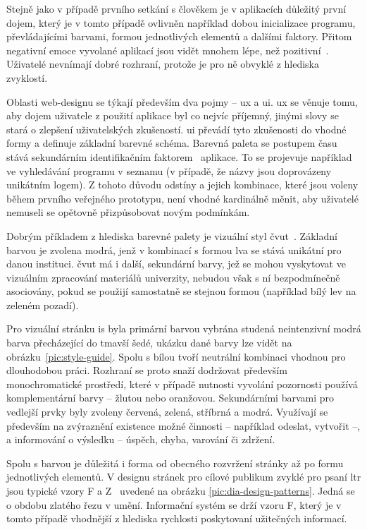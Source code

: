 Stejně jako v případě prvního setkání s člověkem je v aplikacích důležitý první dojem, který je v tomto případě ovlivněn například dobou inicializace programu, převládajícími barvami, formou jednotlivých elementů a dalšími faktory. Přitom negativní emoce vyvolané aplikací jsou vidět mnohem lépe, než pozitivní~\cite{tragicDesign}. Uživatelé nevnímají dobré rozhraní, protože je pro ně obvyklé z hlediska zvyklostí.

Oblasti web-designu se týkají především dva pojmy -- \gls{ux} a \gls{ui}. \gls{ux} se věnuje tomu, aby dojem uživatele z použití aplikace byl co nejvíc příjemný, jinými slovy se stará o zlepšení uživatelských zkušeností. \gls{ui} převádí tyto zkušenosti do vhodné formy a definuje základní barevné schéma. Barevná paleta se postupem času stává sekundárním identifikačním faktorem~\cite{colorTheory} aplikace. To se projevuje například ve vyhledávání programu v seznamu (v případě, že názvy jsou doprovázeny unikátním logem). Z tohoto důvodu odstíny a jejich kombinace, které jsou voleny během prvního veřejného prototypu, není vhodné kardinálně měnit, aby uživatelé nemuseli se opětovně přizpůsobovat novým podmínkám.

Dobrým příkladem z hlediska barevné palety je vizuální styl \gls{čvut}~\cite{cvutStyleGuide}. Základní barvou je zvolena modrá, jenž v kombinací s formou lva se stává unikátní pro danou instituci. \gls{čvut} má i další, sekundární barvy, jež se mohou vyskytovat ve vizuálním zpracování materiálů univerzity, nebudou však s ní bezpodmínečně asociovány, pokud se použijí samostatně se stejnou formou (například bílý lev na zeleném pozadí).

Pro vizuální stránku \gls{is} byla primární barvou vybrána studená neintenzivní modrá barva přecházející do tmavší šedé, ukázku dané barvy lze vidět na obrázku~\ref{pic:style-guide}. Spolu s bílou tvoří neutrální kombinaci vhodnou pro dlouhodobou práci. Rozhraní se proto snaží dodržovat především monochromatické prostředí, které v případě nutnosti vyvolání pozornosti používá komplementární barvy -- žlutou nebo oranžovou. Sekundárními barvami pro vedlejší prvky byly zvoleny červená, zelená, stříbrná a modrá. Využívají se především na zvýraznění existence možné činnosti -- například odeslat, vytvořit --, a informování o výsledku -- úspěch, chyba, varování či zdržení.

Spolu s barvou je důležitá i forma od obecného rozvržení stránky až po formu jednotlivých elementů. V designu stránek pro cílové publikum zvyklé pro psaní \gls{ltr} jsou typické vzory F a Z~\cite{zfPatterns} uvedené na obrázku \ref{pic:dia-design-patterns}. Jedná se o obdobu zlatého řezu v umění. Informační systém se drží vzoru F, který je v tomto případě vhodnější z hlediska rychlosti poskytovaní užitečných informací.

